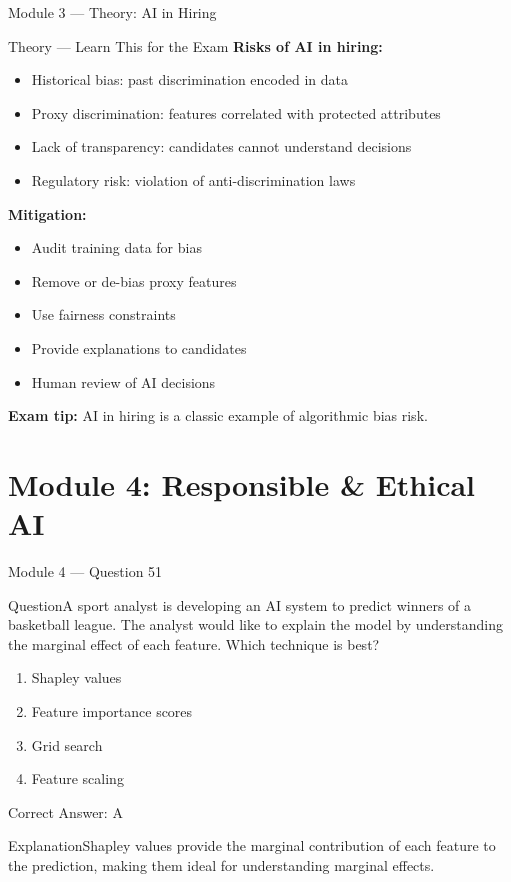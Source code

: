 \documentclass[aspectratio=169,10pt]{beamer}
\newcommand{\question}[1]{\begin{block}{Question}#1\end{block}}
\newcommand{\options}[4]{%
	\begin{enumerate}[label=\Alph*.,leftmargin=*]
		\item #1
		\item #2
		\item #3
		\item #4
	\end{enumerate}
}
\newcommand{\answerbox}[1]{\begin{exampleblock}{Correct Answer: #1}\end{exampleblock}}
\newcommand{\explain}[1]{\begin{block}{Explanation}#1\end{block}}
\newcommand{\theory}[1]{%
	\begin{block}{Theory --- Learn This for the Exam}
		\small #1
	\end{block}
}
\begin{document}
	\begin{frame}{Module 3 --- Theory: AI in Hiring}
		\theory{
			\textbf{Risks of AI in hiring:}
			\begin{itemize}
				\item Historical bias: past discrimination encoded in data
				\item Proxy discrimination: features correlated with protected attributes
				\item Lack of transparency: candidates cannot understand decisions
				\item Regulatory risk: violation of anti-discrimination laws
			\end{itemize}
			\textbf{Mitigation:}
			\begin{itemize}
				\item Audit training data for bias
				\item Remove or de-bias proxy features
				\item Use fairness constraints
				\item Provide explanations to candidates
				\item Human review of AI decisions
			\end{itemize}
			\textbf{Exam tip:} AI in hiring is a classic example of algorithmic bias risk.
		}
	\end{frame}
	
	\section{Module 4: Responsible \& Ethical AI}
	
	\begin{frame}{Module 4 --- Question 51}
		\question{A sport analyst is developing an AI system to predict winners of a basketball league. The analyst would like to explain the model by understanding the marginal effect of each feature. Which technique is best?}
		\options{Shapley values}{Feature importance scores}{Grid search}{Feature scaling}
		\answerbox{A}
		\explain{Shapley values provide the marginal contribution of each feature to the prediction, making them ideal for understanding marginal effects.}
	\end{frame}
	
\end{document}
